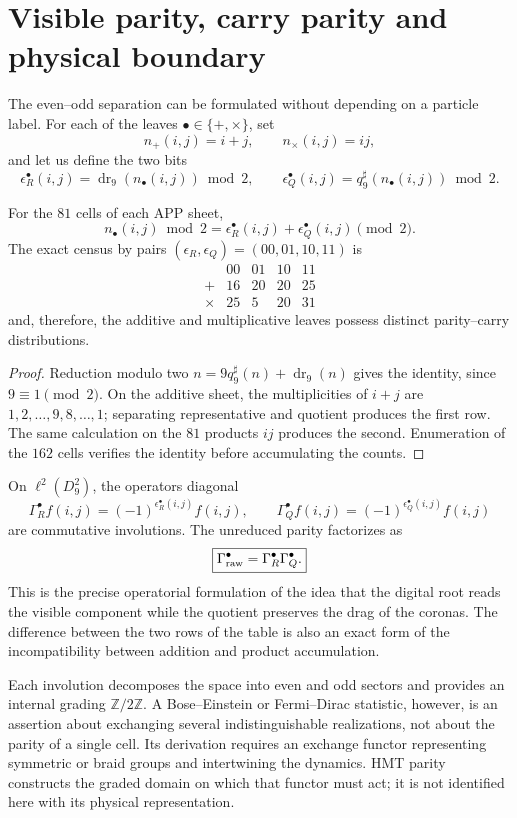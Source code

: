 \section{Visible parity, carry parity and physical boundary}

The even--odd separation can be formulated without depending on a particle
label. For each of the leaves
\(\bullet\in\{+,\times\}\), set
\[
 n_+(i,j)=i+j,
 \qquad
 n_\times(i,j)=ij,
\]
and let us define the two bits
\[
 \epsilon_R^\bullet(i,j)
 =\operatorname{dr}_9(n_\bullet(i,j))\bmod2,
 \qquad
 \epsilon_Q^\bullet(i,j)
 =q_9^\sharp(n_\bullet(i,j))\bmod2.
\]

\begin{theorem}
\label{thm:factorizacion-paridad-acarreo}
For the \(81\) cells of each APP sheet,
\[
 \boxed{
 n_\bullet(i,j)\bmod2
 =\epsilon_R^\bullet(i,j)+\epsilon_Q^\bullet(i,j)\pmod2.}
\]
The exact census by pairs
\((\epsilon_R,\epsilon_Q)=(00,01,10,11)\) is
\[
 \begin{array}{c|rrrr}
  &00&01&10&11\\
 \hline
 +&16&20&20&25\\
 \times&25&5&20&31
 \end{array}
\]
and, therefore, the additive and multiplicative leaves possess distinct
parity--carry distributions.
\end{theorem}

\begin{proof}
Reduction modulo two
\(n=9q_9^\sharp(n)+\operatorname{dr}_9(n)\) gives the identity, since
\(9\equiv1\pmod2\). On the additive sheet, the multiplicities of \(i+j\) are
\(1,2,\ldots,9,8,\ldots,1\); separating representative and quotient produces the
first row. The same calculation on the \(81\) products \(ij\) produces the
second. Enumeration of the \(162\) cells verifies the identity before
accumulating the counts.\qedhere
\end{proof}

On \(\ell^2(D_9^2)\), the operators diagonal
\[
 \Gamma_R^\bullet f(i,j)
 =(-1)^{\epsilon_R^\bullet(i,j)}f(i,j),
 \qquad
 \Gamma_Q^\bullet f(i,j)
 =(-1)^{\epsilon_Q^\bullet(i,j)}f(i,j)
\]
are commutative involutions. The unreduced parity factorizes as
\[
 \boxed{\Gamma_{\rm raw}^\bullet
 =\Gamma_R^\bullet\Gamma_Q^\bullet.}
\]
This is the precise operatorial formulation of the idea that the digital root
reads the visible component while the quotient preserves the drag of the coronas. The
difference between the two rows of the table is also an exact form of the
incompatibility between addition and product accumulation.

Each involution decomposes the space into even and odd sectors and provides
an internal grading \(\mathbb Z/2\mathbb Z\). A Bose--Einstein or Fermi--Dirac
statistic, however, is an assertion about exchanging several indistinguishable
realizations, not about the parity of a single cell. Its derivation requires
an exchange functor representing symmetric or braid groups
and intertwining the dynamics. HMT parity constructs
the graded domain on which that functor must act; it is not identified
here with its physical representation.
